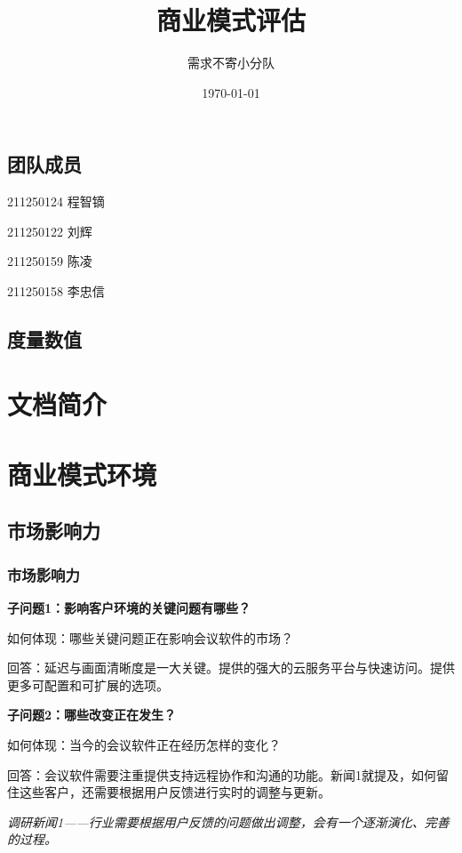 \documentclass[a4paper,12pt]{article}
\title{商业模式评估}
\author{需求不寄小分队}
\date{\today}
\begin{document}
    \maketitle

    \tableofcontents


    \subsection{团队成员}
    211250124 程智镝

    211250122 刘辉

    211250159 陈凌

    211250158 李忠信
    \subsection{度量数值}

    \section{文档简介}
    

    \section{商业模式环境}
    \subsection{市场影响力}
    \subsubsection{市场影响力}
    \textbf{子问题1：影响客户环境的关键问题有哪些？}
    
    如何体现：哪些关键问题正在影响会议软件的市场？
    
    回答：延迟与画⾯清晰度是⼀⼤关键。提供的强⼤的云服务平台与快速访问。提供更多可配置和可扩展的选项。
    
    \textbf{子问题2：哪些改变正在发生？}

    如何体现：当今的会议软件正在经历怎样的变化？

    回答：会议软件需要注重提供支持远程协作和沟通的功能。新闻1就提及，如何留住这些客户，还需要根据⽤户反馈进⾏实时的调整与更新。

    \textit{调研新闻1——⾏业需要根据⽤户反馈的问题做出调整，会有⼀个逐渐演化、完善的过程。}
    
\end{document}
